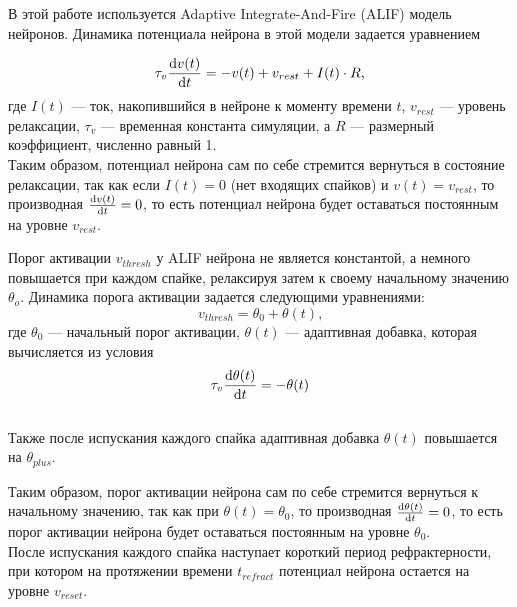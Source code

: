 \documentclass[a4paper]{article}
\begin{document}
В этой работе используется Adaptive Integrate-And-Fire (ALIF) модель нейронов. Динамика потенциала нейрона в этой модели задается уравнением

\begin{equation} \label{eq:alif}
 \tau_v \dv{v(t)}{t} = -v(t) + v_{rest} + I(t) \cdot R \text{,}
\end{equation} где $I(t)$ --- ток, накопившийся в нейроне к моменту времени $t$, $v_{rest}$ --- уровень релаксации, $\tau_v$ --- временная константа симуляции, а $R$ --- размерный коэффициент, численно равный 1.\\ 

Таким образом, потенциал нейрона сам по себе стремится вернуться в состояние релаксации, так как если $I(t) = 0$ (нет входящих спайков) и $v(t) = v_{rest}$, то производная $\dv{v(t)}{t} = 0$, то есть потенциал нейрона будет оставаться постоянным на уровне $v_{rest}$. 

Порог активации $v_{thresh}$ у ALIF нейрона не является константой, а немного повышается при каждом спайке, релаксируя затем к своему начальному значению $\theta_o$. Динамика порога активации задается следующими уравнениями:
\begin{equation} 
 v_{thresh} = \theta_0 + \theta(t) \text{,}
\end{equation} где $\theta_0$ --- начальный порог активации, $\theta(t)$ --- адаптивная добавка, которая вычисляется из условия\\

\begin{equation}
 \tau_v \dv{\theta(t)}{t} = -\theta(t)
\end{equation}\\

Также после испускания каждого спайка адаптивная добавка $\theta(t)$ повышается на $\theta_{plus}$.

Таким образом, порог активации нейрона сам по себе стремится вернуться к начальному значению, так как при $\theta(t) = \theta_0$, то производная $\dv{\theta(t)}{t} = 0$, то есть порог активации нейрона будет оставаться постоянным на уровне $\theta_0$.\\

После испускания каждого спайка наступает короткий период рефрактерности, при котором на протяжении времени $t_{refract}$ потенциал нейрона остается на уровне $v_{reset}$.
\end{document}
